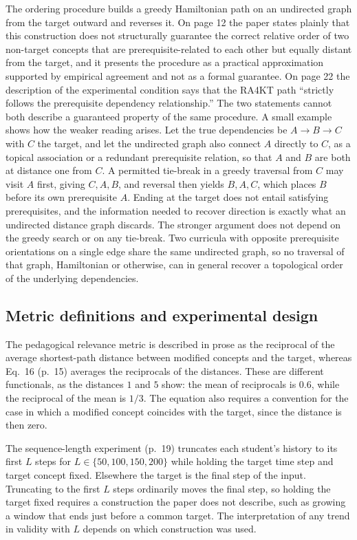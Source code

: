 \documentclass[11pt]{article}
\begin{document}
The ordering procedure builds a greedy Hamiltonian path on an undirected graph from the target outward and reverses it. On page 12 the paper states plainly that this construction does not structurally guarantee the correct relative order of two non-target concepts that are prerequisite-related to each other but equally distant from the target, and it presents the procedure as a practical approximation supported by empirical agreement and not as a formal guarantee. On page 22 the description of the experimental condition says that the RA4KT path ``strictly follows the prerequisite dependency relationship.'' The two statements cannot both describe a guaranteed property of the same procedure. A small example shows how the weaker reading arises. Let the true dependencies be $A\rightarrow B\rightarrow C$ with $C$ the target, and let the undirected graph also connect $A$ directly to $C$, as a topical association or a redundant prerequisite relation, so that $A$ and $B$ are both at distance one from $C$. A permitted tie-break in a greedy traversal from $C$ may visit $A$ first, giving $C,A,B$, and reversal then yields $B,A,C$, which places $B$ before its own prerequisite $A$. Ending at the target does not entail satisfying prerequisites, and the information needed to recover direction is exactly what an undirected distance graph discards. The stronger argument does not depend on the greedy search or on any tie-break. Two curricula with opposite prerequisite orientations on a single edge share the same undirected graph, so no traversal of that graph, Hamiltonian or otherwise, can in general recover a topological order of the underlying dependencies.

\subsection{Metric definitions and experimental design}

The pedagogical relevance metric is described in prose as the reciprocal of the average shortest-path distance between modified concepts and the target, whereas Eq.~16 (p.~15) averages the reciprocals of the distances. These are different functionals, as the distances $1$ and $5$ show: the mean of reciprocals is $0.6$, while the reciprocal of the mean is $1/3$. The equation also requires a convention for the case in which a modified concept coincides with the target, since the distance is then zero.

The sequence-length experiment (p.~19) truncates each student's history to its first $L$ steps for $L\in\{50,100,150,200\}$ while holding the target time step and target concept fixed. Elsewhere the target is the final step of the input. Truncating to the first $L$ steps ordinarily moves the final step, so holding the target fixed requires a construction the paper does not describe, such as growing a window that ends just before a common target. The interpretation of any trend in validity with $L$ depends on which construction was used.
\end{document}
